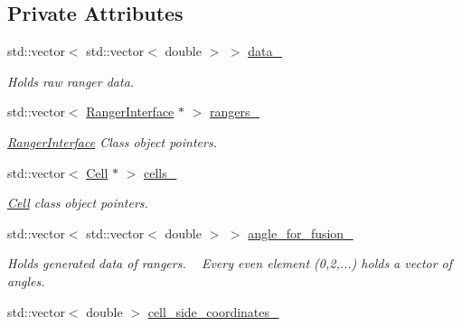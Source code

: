 \subsection*{Private Attributes}
\begin{DoxyCompactItemize}
\item 
std\+::vector$<$ std\+::vector$<$ double $>$ $>$ \hyperlink{classRangerFusion_a2fa4a5228da72e2f33dd1121cf2644a7}{data\+\_\+}\hypertarget{classRangerFusion_a2fa4a5228da72e2f33dd1121cf2644a7}{}\label{classRangerFusion_a2fa4a5228da72e2f33dd1121cf2644a7}

\begin{DoxyCompactList}\small\item\em Holds raw ranger data. \end{DoxyCompactList}\item 
std\+::vector$<$ \hyperlink{classRangerInterface}{Ranger\+Interface} $\ast$ $>$ \hyperlink{classRangerFusion_ac0608d2ac2fbccdd394f3e920d2f4db9}{rangers\+\_\+}\hypertarget{classRangerFusion_ac0608d2ac2fbccdd394f3e920d2f4db9}{}\label{classRangerFusion_ac0608d2ac2fbccdd394f3e920d2f4db9}

\begin{DoxyCompactList}\small\item\em \hyperlink{classRangerInterface}{Ranger\+Interface} Class object pointers. \end{DoxyCompactList}\item 
std\+::vector$<$ \hyperlink{classCell}{Cell} $\ast$ $>$ \hyperlink{classRangerFusion_aafc6b84823abfae3dc3a5095da43888e}{cells\+\_\+}\hypertarget{classRangerFusion_aafc6b84823abfae3dc3a5095da43888e}{}\label{classRangerFusion_aafc6b84823abfae3dc3a5095da43888e}

\begin{DoxyCompactList}\small\item\em \hyperlink{classCell}{Cell} class object pointers. \end{DoxyCompactList}\item 
std\+::vector$<$ std\+::vector$<$ double $>$ $>$ \hyperlink{classRangerFusion_a2e57dd1467e95392d4652230279ea189}{angle\+\_\+for\+\_\+fusion\+\_\+}
\begin{DoxyCompactList}\small\item\em Holds generated data of rangers. ~\newline
 Every even element (0,2,...) holds a vector of angles. \end{DoxyCompactList}\item 
std\+::vector$<$ double $>$ \hyperlink{classRangerFusion_ae250d57e1fc380c5a07bceabb75561fa}{cell\+\_\+side\+\_\+coordinates\+\_\+}\hypertarget{classRangerFusion_ae250d57e1fc380c5a07bceabb75561fa}{}\label{classRangerFusion_ae250d57e1fc380c5a07bceabb75561fa}


\end{DoxyCompactItemize}
